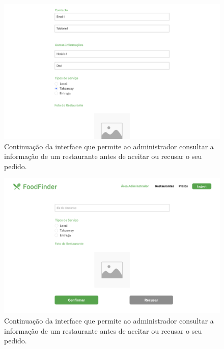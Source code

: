 \documentclass[a4paper,12pt]{report}
\begin{document}
	
	\begin{figure}[H]
	\begin{center}
	\includegraphics[scale=0.25]{16.1-Pedidos_Restaurante_Consultar_Administrador_2}	
	\end{center}
	\caption{Continuação da interface que permite ao administrador consultar a informação de um restaurante antes de aceitar ou recusar o seu pedido.}
	\end{figure} 
	
	\begin{figure}[H]
	\begin{center}
	\includegraphics[scale=0.25]{17.1-Pedidos_Restaurante_Consultar_Administrador_3}	
	\end{center}
	\caption{Continuação da interface que permite ao administrador consultar a informação de um restaurante antes de aceitar ou recusar o seu pedido.}
	\end{figure} 
	
\end{document}
